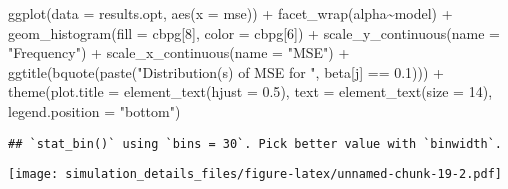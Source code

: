 \documentclass[
]{article}
\newenvironment{Shaded}{\begin{snugshade}}{\end{snugshade}}
\newcommand{\AttributeTok}[1]{\textcolor[rgb]{0.77,0.63,0.00}{#1}}
\newcommand{\DecValTok}[1]{\textcolor[rgb]{0.00,0.00,0.81}{#1}}
\newcommand{\FloatTok}[1]{\textcolor[rgb]{0.00,0.00,0.81}{#1}}
\newcommand{\FunctionTok}[1]{\textcolor[rgb]{0.00,0.00,0.00}{#1}}
\newcommand{\NormalTok}[1]{#1}
\newcommand{\SpecialCharTok}[1]{\textcolor[rgb]{0.00,0.00,0.00}{#1}}
\newcommand{\StringTok}[1]{\textcolor[rgb]{0.31,0.60,0.02}{#1}}
\begin{document}
\begin{Shaded}
\begin{Highlighting}[]
\FunctionTok{ggplot}\NormalTok{(}\AttributeTok{data =}\NormalTok{ results.opt,}
       \FunctionTok{aes}\NormalTok{(}\AttributeTok{x =}\NormalTok{ mse)) }\SpecialCharTok{+}
  \FunctionTok{facet\_wrap}\NormalTok{(alpha}\SpecialCharTok{\textasciitilde{}}\NormalTok{model) }\SpecialCharTok{+}
  \FunctionTok{geom\_histogram}\NormalTok{(}\AttributeTok{fill =}\NormalTok{ cbpg[}\DecValTok{8}\NormalTok{], }\AttributeTok{color =}\NormalTok{ cbpg[}\DecValTok{6}\NormalTok{]) }\SpecialCharTok{+}
  \FunctionTok{scale\_y\_continuous}\NormalTok{(}\AttributeTok{name =} \StringTok{"Frequency"}\NormalTok{) }\SpecialCharTok{+}
  \FunctionTok{scale\_x\_continuous}\NormalTok{(}\AttributeTok{name =} \StringTok{"MSE"}\NormalTok{) }\SpecialCharTok{+}
  \FunctionTok{ggtitle}\NormalTok{(}\FunctionTok{bquote}\NormalTok{(}\FunctionTok{paste}\NormalTok{(}\StringTok{"Distribution(s) of MSE for "}\NormalTok{, beta[j] }\SpecialCharTok{==} \FloatTok{0.1}\NormalTok{))) }\SpecialCharTok{+}
  \FunctionTok{theme}\NormalTok{(}\AttributeTok{plot.title =} \FunctionTok{element\_text}\NormalTok{(}\AttributeTok{hjust =} \FloatTok{0.5}\NormalTok{), }
        \AttributeTok{text =} \FunctionTok{element\_text}\NormalTok{(}\AttributeTok{size =} \DecValTok{14}\NormalTok{),}
        \AttributeTok{legend.position =} \StringTok{"bottom"}\NormalTok{)}
\end{Highlighting}
\end{Shaded}

\begin{verbatim}
## `stat_bin()` using `bins = 30`. Pick better value with `binwidth`.
\end{verbatim}

\texttt{[image: simulation\_details\_files/figure-latex/unnamed-chunk-19-2.pdf]}
\end{document}
